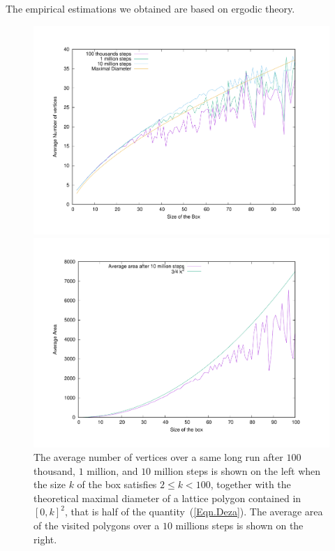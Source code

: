 \documentclass[a4paper,10pt]{article}
\begin{document}
The empirical estimations we obtained are based on ergodic theory.
\noindent
\begin{figure}[b!]
  \begin{center}
    \begin{minipage}[c]{.49\linewidth}
      \includegraphics[scale=.20]{averageVertices}
    \end{minipage}
    \begin{minipage}[c]{.49\linewidth}
      \includegraphics[scale=.20]{averageVolume10M}
    \end{minipage}
    \caption{The average number of vertices over a same long run after $100$ thousand, $1$ million, and $10$ million steps is shown on the left when the size $k$ of the box satisfies $2\leq k<100$, together with the theoretical maximal diameter of a lattice polygon contained in $[0,k]^2$, that is half of the quantity~(\ref{Eqn.Deza}). The average area of the visited polygons over a $10$ millions steps is shown on the right.
    \label{Fig.NV}}
  \end{center}
\end{figure}
\end{document}
